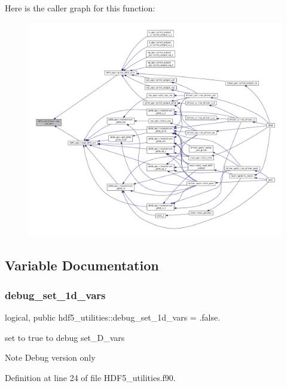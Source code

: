 Here is the caller graph for this function\+:\nopagebreak
\begin{figure}[H]
\begin{center}
\leavevmode
\includegraphics[width=350pt]{namespacehdf5__utilities_a7574320980affc30a584f7776d33a51c_icgraph}
\end{center}
\end{figure}


\subsection{Variable Documentation}
\mbox{\label{namespacehdf5__utilities_addf084b90450dc2a0cc614f2f5ac13fc}} 
\subsubsection{\texorpdfstring{debug\+\_\+set\+\_\+1d\+\_\+vars}{debug\_set\_1d\_vars}}
{\footnotesize\ttfamily logical, public hdf5\+\_\+utilities\+::debug\+\_\+set\+\_\+1d\+\_\+vars = .false.}



set to true to debug set\+\_\+D\+\_\+vars 

\begin{DoxyNote}{Note}
Debug version only 
\end{DoxyNote}


Definition at line 24 of file H\+D\+F5\+\_\+utilities.\+f90.

